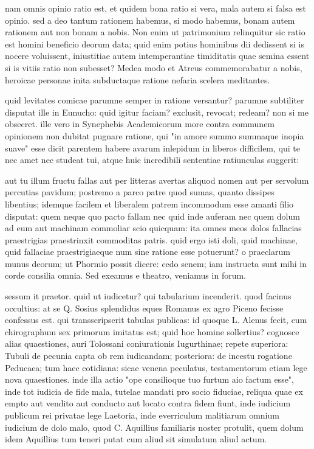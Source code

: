  nam omnis opinio ratio est, et quidem bona ratio si vera, mala autem si falsa est opinio. sed a deo tantum rationem habemus, si modo habemus, bonam autem rationem aut non bonam a nobis. Non enim ut patrimonium relinquitur sic ratio est homini beneficio deorum data; quid enim potius hominibus dii dedissent si is nocere voluissent, iniustitiae autem intemperantiae timiditatis quae semina essent si is vitiis ratio non subesset? Medea modo et Atreus commemorabatur a nobis, heroicae personae inita subductaque ratione nefaria scelera meditantes.

 quid levitates comicae parumne semper in ratione versantur? parumne subtiliter disputat ille in Eunucho: quid igitur faciam? exclusit, revocat; redeam? non si me obsecret. ille vero in Synephebis Academicorum more contra communem opinionem non dubitat pugnare ratione, qui "in amore summo summaque inopia suave" esse dicit parentem habere avarum inlepidum in liberos difficilem, qui te nec amet nec studeat tui, atque huic incredibili sententiae ratiunculas suggerit:

 aut tu illum fructu fallas aut per litteras avertas aliquod nomen aut per servolum percutias pavidum; postremo a parco patre quod sumas, quanto dissipes libentius; idemque facilem et liberalem patrem incommodum esse amanti filio disputat: quem neque quo pacto fallam nec quid inde auferam nec quem dolum ad eum aut machinam commoliar scio quicquam: ita omnes meos dolos fallacias praestrigias praestrinxit commoditas patris. quid ergo isti doli, quid machinae, quid fallaciae praestrigiaeque num sine ratione esse potuerunt? o praeclarum munus deorum; ut Phormio possit dicere: cedo senem; iam instructa sunt mihi in corde consilia omnia. Sed exeamus e theatro, veniamus in forum.

 sessum it praetor. quid ut iudicetur? qui tabularium incenderit. quod facinus occultius: at se Q. Sosius splendidus eques Romanus ex agro Piceno fecisse confessus est. qui transscripserit tabulas publicas: id quoque L. Alenus fecit, cum chirographum sex primorum imitatus est; quid hoc homine sollertius? cognosce alias quaestiones, auri Tolossani coniurationis Iugurthinae; repete superiora: Tubuli de pecunia capta ob rem iudicandam; posteriora: de incestu rogatione Peducaea; tum haec cotidiana: sicae venena peculatus, testamentorum etiam lege nova quaestiones. inde illa actio "ope consilioque tuo furtum aio factum esse", inde tot iudicia de fide mala, tutelae mandati pro socio fiduciae, reliqua quae ex empto aut vendito aut conducto aut locato contra fidem fiunt, inde iudicium publicum rei privatae lege Laetoria, inde everriculum malitiarum omnium iudicium de dolo malo, quod C. Aquillius familiaris noster protulit, quem dolum idem Aquillius tum teneri putat cum aliud sit simulatum aliud actum.

